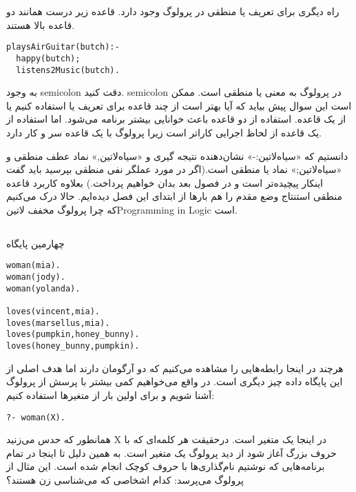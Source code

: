 راه دیگری برای تعریف یا منطقی در پرولوگ وجود دارد. قاعده زیر درست همانند دو قاعده بالا هستند.

\begin{latin}
\begin{lstlisting}
playsAirGuitar(butch):-
  happy(butch);
  listens2Music(butch).
\end{lstlisting}
\end{latin}

به وجود semicolon دقت کنید. semicolon در پرولوگ به معنی یا منطقی است. ممکن است این سوال پیش بیاید که آیا بهتر است از چند قاعده برای تعریف یا استفاده کنیم یا از یک قاعده. استفاده از دو قاعده باعث خوانایی بیشتر برنامه می‌شود. اما استفاده از یک قاعده از لحاظ اجرایی کاراتر است زیرا پرولوگ با یک قاعده سر و کار دارد.

دانستیم که «‌سیاه{‌لاتین{:-}}» نشان‌دهنده نتیجه گیری و «‌سیاه{‌لاتین{,}}» نماد عطف منطقی و «‌سیاه{‌لاتین{;}}» نماد یا منطقی است.(اگر در مورد عملگر نفی منطقی بپرسید باید گفت اینکار پیچیده‌تر است و در فصول بعد بدان خواهیم پرداخت.) بعلاوه کاربرد قاعده منطقی استنتاج وضع مقدم را هم بارها از ابتدای این فصل دیده‌ایم. حالا درک می‌کنیم که چرا پرولوگ مخفف ‌لاتین{Programming in Logic} است.

\subsection{}
چهارمین پایگاه

\begin{latin}
\begin{lstlisting}[title=KB4]
woman(mia). 
woman(jody). 
woman(yolanda). 
    
loves(vincent,mia). 
loves(marsellus,mia). 
loves(pumpkin,honey_bunny). 
loves(honey_bunny,pumpkin).
\end{lstlisting}
\end{latin}

هرچند در اینجا رابطه‌هایی را مشاهده می‌کنیم که دو آرگومان دارند اما هدف اصلی از این پایگاه داده چیز دیگری است. در واقع می‌خواهیم کمی بیشتر با پرسش از پرولوگ آشنا شویم و برای اولین بار از متغیرها استفاده کنیم:

\begin{latin}
\begin{lstlisting}
?- woman(X).
\end{lstlisting}
\end{latin}

همانطور که حدس می‌زنید X در اینجا یک متغیر است. درحقیقت هر کلمه‌ای که با حروف بزرگ آغاز شود از دید پرولوگ یک متغیر است. به همین دلیل تا اینجا در تمام برنامه‌هایی که نوشتیم نام‌گذاری‌‌ها با حروف کوچک انجام شده است. این مثال از پرولوگ می‌پرسد: کدام اشخاصی که می‌شناسی زن هستند؟

